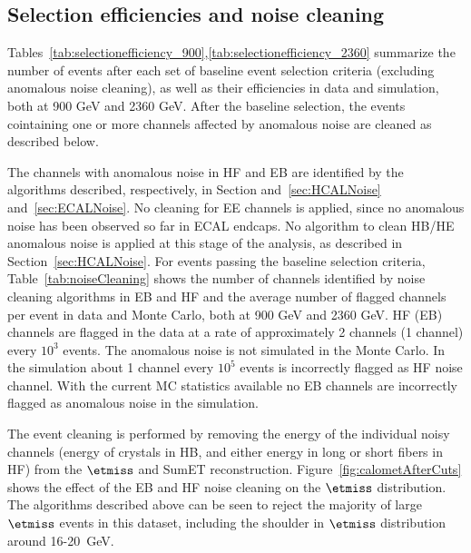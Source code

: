 
\subsection{Selection efficiencies and noise cleaning}

Tables~\ref{tab:selectionefficiency_900},\ref{tab:selectionefficiency_2360}
summarize the number of events after each set of baseline event selection
criteria (excluding anomalous noise cleaning), 
as well as their efficiencies in data and simulation, both at 900 GeV and 2360 GeV. 
After the baseline selection, the events cointaining one or more channels 
affected by anomalous noise are cleaned as described below.
 
The channels with anomalous noise in HF and EB are identified by the algorithms 
described, respectively, in Section and~\ref{sec:HCALNoise} and~\ref{sec:ECALNoise}.
No cleaning for EE channels is applied, since no anomalous noise has been observed 
so far in ECAL endcaps. No algorithm to clean HB/HE anomalous noise is applied 
at this stage of the analysis, as described in Section~\ref{sec:HCALNoise}.
For events passing the baseline selection criteria, Table~\ref{tab:noiseCleaning} shows the number of
channels identified by noise cleaning algorithms in EB and HF and the average number of flagged channels 
per event in data and Monte Carlo, both at 900 GeV and 2360 GeV.
HF (EB) channels are flagged in the data at a rate of approximately 2 channels (1 channel) 
every $10^3$ events. The anomalous noise is not simulated in the Monte Carlo. In the simulation 
about 1 channel every $10^5$ events is incorrectly flagged as HF noise channel.
With the current MC statistics available no EB channels are incorrectly flagged 
as anomalous noise in the simulation.

The event cleaning is performed by removing the energy of the 
individual noisy channels (energy of crystals in HB, and either energy in 
long or short fibers in HF) from the $\etmiss$ and SumET reconstruction.
Figure~\ref{fig:calometAfterCuts} shows the effect of the EB and HF 
noise cleaning on the $\etmiss$ distribution.
The algorithms described above can be seen to reject the majority of
large $\etmiss$ events in this dataset, 
including the shoulder in $\etmiss$ distribution around 16-20~GeV.

